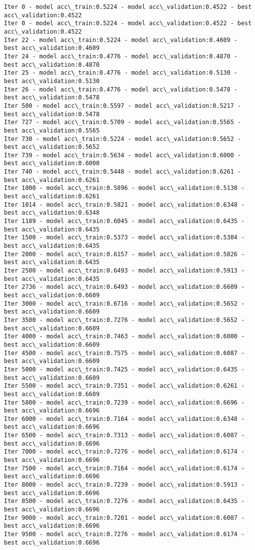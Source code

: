 \documentclass[a4paper,12pt]{article}
\begin{document}
    \begin{Verbatim}[commandchars=\\\{\},fontsize=\small]
Iter 0 - model acc\_train:0.5224 - model acc\_validation:0.4522 - best acc\_validation:0.4522
Iter 0 - model acc\_train:0.5224 - model acc\_validation:0.4522 - best acc\_validation:0.4522
Iter 22 - model acc\_train:0.5224 - model acc\_validation:0.4609 - best acc\_validation:0.4609
Iter 24 - model acc\_train:0.4776 - model acc\_validation:0.4870 - best acc\_validation:0.4870
Iter 25 - model acc\_train:0.4776 - model acc\_validation:0.5130 - best acc\_validation:0.5130
Iter 26 - model acc\_train:0.4776 - model acc\_validation:0.5478 - best acc\_validation:0.5478
Iter 500 - model acc\_train:0.5597 - model acc\_validation:0.5217 - best acc\_validation:0.5478
Iter 727 - model acc\_train:0.5709 - model acc\_validation:0.5565 - best acc\_validation:0.5565
Iter 730 - model acc\_train:0.5224 - model acc\_validation:0.5652 - best acc\_validation:0.5652
Iter 739 - model acc\_train:0.5634 - model acc\_validation:0.6000 - best acc\_validation:0.6000
Iter 740 - model acc\_train:0.5448 - model acc\_validation:0.6261 - best acc\_validation:0.6261
Iter 1000 - model acc\_train:0.5896 - model acc\_validation:0.5130 - best acc\_validation:0.6261
Iter 1014 - model acc\_train:0.5821 - model acc\_validation:0.6348 - best acc\_validation:0.6348
Iter 1189 - model acc\_train:0.6045 - model acc\_validation:0.6435 - best acc\_validation:0.6435
Iter 1500 - model acc\_train:0.5373 - model acc\_validation:0.5304 - best acc\_validation:0.6435
Iter 2000 - model acc\_train:0.6157 - model acc\_validation:0.5826 - best acc\_validation:0.6435
Iter 2500 - model acc\_train:0.6493 - model acc\_validation:0.5913 - best acc\_validation:0.6435
Iter 2736 - model acc\_train:0.6493 - model acc\_validation:0.6609 - best acc\_validation:0.6609
Iter 3000 - model acc\_train:0.6716 - model acc\_validation:0.5652 - best acc\_validation:0.6609
Iter 3500 - model acc\_train:0.7276 - model acc\_validation:0.5652 - best acc\_validation:0.6609
Iter 4000 - model acc\_train:0.7463 - model acc\_validation:0.6000 - best acc\_validation:0.6609
Iter 4500 - model acc\_train:0.7575 - model acc\_validation:0.6087 - best acc\_validation:0.6609
Iter 5000 - model acc\_train:0.7425 - model acc\_validation:0.6435 - best acc\_validation:0.6609
Iter 5500 - model acc\_train:0.7351 - model acc\_validation:0.6261 - best acc\_validation:0.6609
Iter 5800 - model acc\_train:0.7239 - model acc\_validation:0.6696 - best acc\_validation:0.6696
Iter 6000 - model acc\_train:0.7164 - model acc\_validation:0.6348 - best acc\_validation:0.6696
Iter 6500 - model acc\_train:0.7313 - model acc\_validation:0.6087 - best acc\_validation:0.6696
Iter 7000 - model acc\_train:0.7276 - model acc\_validation:0.6174 - best acc\_validation:0.6696
Iter 7500 - model acc\_train:0.7164 - model acc\_validation:0.6174 - best acc\_validation:0.6696
Iter 8000 - model acc\_train:0.7239 - model acc\_validation:0.5913 - best acc\_validation:0.6696
Iter 8500 - model acc\_train:0.7276 - model acc\_validation:0.6435 - best acc\_validation:0.6696
Iter 9000 - model acc\_train:0.7201 - model acc\_validation:0.6087 - best acc\_validation:0.6696
Iter 9500 - model acc\_train:0.7276 - model acc\_validation:0.6174 - best acc\_validation:0.6696
    \end{Verbatim}
\end{document}

